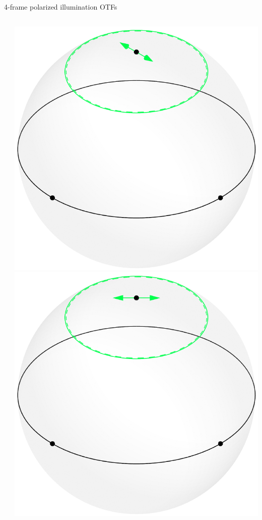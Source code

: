 \documentclass[presentation]{beamer}
\begin{document}
\begin{frame}[label=sec-1]{4-frame polarized illumination OTFs}
\begin{columns}
\begin{column}{0.25\textwidth}
    \end{column}
    \begin{column}{0.25\textwidth}
      \centering
      \includegraphics[width=1.0\columnwidth]{pol_illum/scene2.pdf}\\
      \includegraphics[width=1.0\columnwidth]{pol_illum/scene3.pdf}      

\end{column}
\end{columns}
\end{frame}
\end{document}
